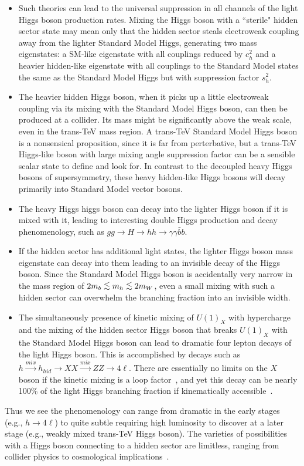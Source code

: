 \documentclass[12pt]{article}
\newcommand{\lsim}{\lower.7ex\hbox{$\;\stackrel{\textstyle<}{\sim}\;$}}
\begin{document}
\begin{itemize}
\item Such theories can lead to the universal suppression in all channels  of the light Higgs boson production rates. Mixing the Higgs boson with a ``sterile" hidden sector state may mean only that the hidden sector steals electroweak coupling away from the lighter Standard Model Higgs, generating two mass eigenstates: a SM-like eigenstate with all couplings reduced by $c_h^2$ and a heavier hidden-like eigenstate with all couplings to the Standard Model states the same as the Standard Model Higgs but with suppression factor $s^2_h$. 
\item The heavier hidden Higgs boson, when it picks up a little electroweak coupling via its mixing with the Standard Model Higgs boson, can then be produced at a collider. Its mass might be significantly above the weak scale, even in the trans-TeV mass region. A trans-TeV Standard Model Higgs boson is a nonsensical proposition, since it is far from perterbative, but a trans-TeV Higgs-like boson with large mixing angle suppression factor can be a sensible scalar state to define and look for. In contrast to the decoupled heavy Higgs bosons of supersymmetry, these heavy hidden-like Higgs bosons will decay primarily into Standard Model vector bosons.
\item The heavy Higgs higgs boson can decay into the lighter Higgs boson if it is mixed with it, leading to interesting double Higgs production and decay phenomenology, such as $gg\to H\to hh\to \gamma\gamma \bar b b$.
\item If the hidden sector has additional light states, the lighter Higgs boson mass eigenstate can decay into them leading to an invisible decay of the Higgs boson. Since the Standard Model Higgs boson is accidentally very narrow in the mass region of $2m_b\lsim m_h\lsim 2m_W$, even a small mixing with such a hidden sector can overwhelm the branching fraction into an invisible width.
\item The simultaneously presence of kinetic mixing of $U(1)_X$ with hypercharge and the mixing of the hidden sector Higgs boson that breaks $U(1)_X$ with the Standard Model Higgs boson can lead to dramatic four lepton decays of the light Higgs boson. This is accomplished by decays such as $h\stackrel{mix}{\longrightarrow}h_{hid}\to XX\stackrel{mix}{\longrightarrow}ZZ\to 4\ell$.  There are essentially no limits on the $X$ boson if the kinetic mixing is a loop factor~\cite{Kumar:2006gm}, and yet this decay can be nearly 100\% of the light Higgs branching fraction if kinematically accessible~\cite{Gopalakrishna:2008dv}.
\end{itemize}
Thus we see the phenomenology can range from dramatic in the early  stages (e.g., $h\to 4\ell$) to quite subtle requiring high luminosity to discover at a later stage (e.g., weakly mixed trans-TeV Higgs boson). The varieties of possibilities with a Higgs boson connecting to a hidden sector are limitless, ranging from collider physics to cosmological implications~\cite{Binoth:1996au,Strassler:2006im,Strassler:2006ri,Bhattacharyya:2007pb,MarchRussell:2008yu,Espinosa:2008kw,Ahlers:2008qc,Gopalakrishna:2009yz}.
\end{document}
